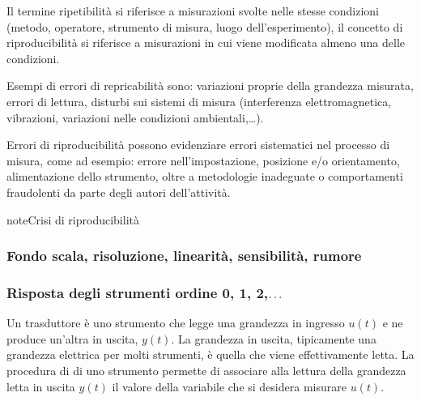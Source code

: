 \documentclass[letterpaper,10pt,italian]{jupyterBook}
\begin{document}
\sphinxAtStartPar
Il termine ripetibilità si riferisce a misurazioni svolte nelle stesse condizioni (metodo, operatore, strumento di misura, luogo dell’esperimento), il concetto di riproducibilità si riferisce a misurazioni in cui viene modificata almeno una delle condizioni.

\sphinxAtStartPar
Esempi di errori di repricabilità sono: variazioni proprie della grandezza misurata, errori di lettura, disturbi sui sistemi di misura (interferenza elettromagnetica, vibrazioni, variazioni nelle condizioni ambientali,…).

\sphinxAtStartPar
Errori di riproducibilità possono evidenziare errori sistematici nel processo di misura, come ad esempio: errore nell’impostazione, posizione e/o orientamento, alimentazione dello strumento, oltre a metodologie inadeguate o comportamenti fraudolenti da parte degli autori dell’attività.

\begin{sphinxadmonition}{note}{Crisi di riproducibilità}



\sphinxAtStartPar
{}
\end{sphinxadmonition}


\subsubsection{Fondo scala, risoluzione, linearità, sensibilità, rumore}
\label{\detokenize{ch/intro/measurements:fondo-scala-risoluzione-linearita-sensibilita-rumore}}
\sphinxAtStartPar
{}

\sphinxAtStartPar
{}

\sphinxAtStartPar
{}

\sphinxAtStartPar
{}


\subsubsection{Risposta degli strumenti \sphinxhyphen{} ordine 0, 1, 2,\protect\(\dots\protect\)}
\label{\detokenize{ch/intro/measurements:risposta-degli-strumenti-ordine-0-1-2-dots}}\label{\detokenize{ch/intro/measurements:physics-hs-intro-measurements-order}}
\sphinxAtStartPar
Un trasduttore è uno strumento che legge una grandezza in ingresso \(u(t)\) e ne produce un’altra in uscita, \(y(t)\). La grandezza in uscita, tipicamente una grandezza elettrica per molti strumenti, è quella che viene effettivamente letta. La procedura di  di uno strumento permette di associare alla lettura della grandezza letta in uscita \(y(t)\) il valore della variabile che si desidera misurare \(u(t)\).
\end{document}
